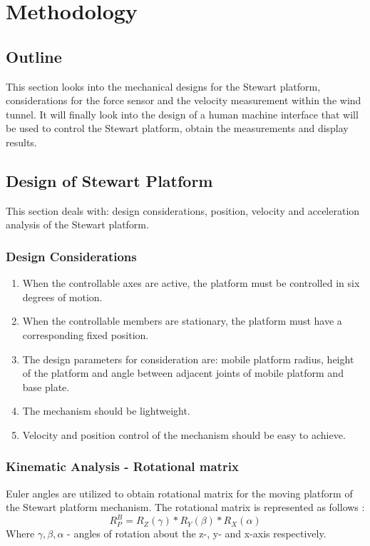\chapter{Methodology}
\section{Outline}
This section looks into the mechanical designs for the Stewart platform, considerations for the force sensor and the velocity measurement within the wind tunnel. It will finally look into the design of a human machine interface that will be used to control the Stewart platform,  obtain the measurements and display results.

\section{Design of Stewart Platform}
This section deals with: design considerations, position, velocity and acceleration analysis of the Stewart platform.
\subsection{Design Considerations}
\begin{enumerate}
\item When the controllable axes are active, the platform must be controlled in six degrees of motion.
\item When the controllable members are stationary, the
platform must have a corresponding fixed position.
\item The design parameters for consideration are: mobile platform radius, height of the platform and angle between adjacent joints of mobile platform and base plate.
\item The mechanism should be lightweight.
\item Velocity and position control of the mechanism should be easy to achieve.
\end{enumerate}
\subsection{Kinematic Analysis - Rotational matrix}
Euler angles are utilized to obtain rotational matrix for the moving platform of the Stewart platform mechanism. The rotational matrix is represented as follows \cite{csumnu2017simulation}:
\begin{equation}
 R_{P}^B = R_{Z}(\gamma)*R_{Y}(\beta)*R_{X}(\alpha)
\end{equation}
Where $\gamma, \beta, \alpha$ - angles of rotation about the z-, y- and x-axis respectively.

